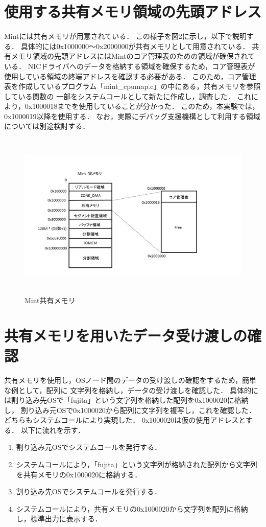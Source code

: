 \documentclass[12pt]{jsarticle}
\begin{document}
\section{使用する共有メモリ領域の先頭アドレス}
Mintには共有メモリが用意されている．
この様子を図2に示し，以下で説明する．
具体的には0x1000000～0x2000000が共有メモリとして用意されている．
共有メモリ領域の先頭アドレスにはMintのコア管理表のための領域が確保されている．
NICドライバへのデータを格納する領域を確保するため，コア管理表が使用している領域の終端アドレスを確認する必要がある．
このため，コア管理表を作成しているプログラム「mint\_cpumap.c」の中にある，共有メモリを参照している関数の
一部をシステムコールとして新たに作成し，調査した．
これにより，0x1000018までを使用していることが分かった．
このため，本実験では，0x1000019以降を使用する．
なお，実際にデバッグ支援機構として利用する領域については別途検討する．


\begin{figure}[t]
\begin{center}
\includegraphics[height=8.0cm]{./fig2.jpg}          
\caption{Mint共有メモリ}
\label{fig:up}
\end{center}
\end{figure}


\section{共有メモリを用いたデータ受け渡しの確認}
共有メモリを使用し，OSノード間のデータの受け渡しの確認をするため，簡単な例として，配列に
文字列を格納し，データの受け渡しを確認した．
具体的には割り込み先OSで「fujita」という文字列を格納した配列を0x1000020に格納し，
割り込み元OSで0x1000020から配列に文字列を複写し，これを確認した．
どちらもシステムコールにより実現した．
0x1000020は仮の使用アドレスとする．
以下に流れを示す．
\begin{enumerate}
\item 割り込み元OSでシステムコールを発行する．
\item システムコールにより，「fujita」という文字列が格納された配列から文字列を共有メモリの0x1000020に格納する．
\item 割り込み先OSでシステムコールを発行する．
\item システムコールにより，共有メモリの0x1000020から文字列を配列に格納し，標準出力に表示する．
\end{enumerate}
\end{document}
